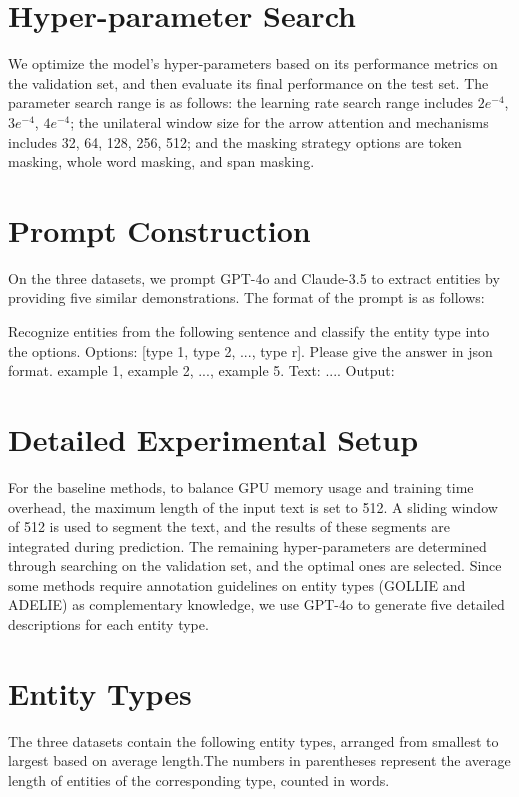 \section{Hyper-parameter Search}

We optimize the model's hyper-parameters based on its performance metrics on the validation set, and then evaluate its final performance on the test set. The parameter search range is as follows: the learning rate search range includes $2e^{-4}$, $3e^{-4}$, $4e^{-4}$; the unilateral window size for the arrow attention and \biswa mechanisms includes 32, 64, 128, 256, 512; and the masking strategy options are token masking, whole word masking, and span masking.

\section{Prompt Construction}

On the three datasets, we prompt GPT-4o and Claude-3.5 to extract entities by providing five similar demonstrations. The format of the prompt is as follows:

Recognize entities from the following sentence and classify the entity type into the options. Options: [type 1, type 2, ..., type r]. Please give the answer in json format.
{example 1}, {example 2}, ...,  {example 5}. Text: .... Output: 

\section{Detailed Experimental Setup}

For the baseline methods, to balance GPU memory usage and training time overhead, the maximum length of the input text is set to 512. A sliding window of 512 is used to segment the text, and the results of these segments are integrated during prediction. The remaining hyper-parameters are determined through searching on the validation set, and the optimal ones are selected. Since some methods require annotation guidelines on entity types (GOLLIE and ADELIE) as complementary knowledge, we use GPT-4o to generate five detailed descriptions for each entity type.

\section{Entity Types}

The three datasets contain the following entity types, arranged from smallest to largest based on average length.The numbers in parentheses represent the average length of entities of the corresponding type, counted in words.

